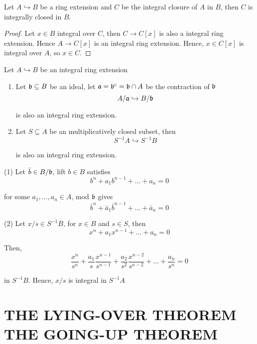 \begin{corollary}
	Let $A \hookrightarrow B$ be a ring extension and $C$ be the integral closure of $A$ in $B$, then $C$ is integrally closed in $B$.
\end{corollary}

\begin{proof}
	Let $x \in B$ integral over $C$, then $C \to C[x]$ is also a integral ring extension. Hence $A \to C[x]$ is an integral ring extension. Hence, $x \in C[x]$ is integral over $A$, so $x \in C$.
\end{proof}

\begin{proposition}
	Let $A \hookrightarrow B$ be an integral ring extension
	\begin{enumerate}
		\item Let $\mathfrak{b} \subseteq B$ be an ideal, let $\mathfrak{a} = \mathfrak{b}^c = \mathfrak{b} \cap A$ be the contraction of $\mathfrak{b}$
		$$
			A / \mathfrak{a} \hookrightarrow B / \mathfrak{b}
		$$
		
		is also an integral ring extension.
		
		\item Let $S \subseteq A$ be an multiplicatively closed subset, then 
		$$
			S^{-1} A \hookrightarrow S^{-1} B
		$$
		
		is also an integral ring extension.
	\end{enumerate}
\end{proposition}
\begin{longproof}
	(1) Let $\bar{b} \in B / \mathfrak{b}$, lift $b \in B$ satisfies
	$$
		b^n + a_1 b^{n-1} + ... + a_n = 0
	$$
	
	for some $a_1, ..., a_n \in A$, mod $\mathfrak{b}$ gives
	$$
		\bar{b}^n + \bar{a}_1 \bar{b}^{n-1} + ... + \bar{a}_n = 0
	$$
	
	(2) Let $x / s \in S^{-1} B$, for $x \in B$ and $s \in S$, then
	$$
		x^n + a_1 x^{n-1} + ... + a_n = 0
	$$
	
	Then,
	$$
		\frac{x^n}{s^n} + \frac{a_1}{s} \frac{x^{n-1}}{s^{n-1}} + \frac{a_2}{s^2} \frac{x^{n-2}}{s^{n-2}} + ... + \frac{a_n}{s^n} = 0
	$$
	
	in $S^{-1} B$. Hence, $x / s$ is integral in $S^{-1} A$
\end{longproof}

\section{THE LYING-OVER THEOREM \\ THE GOING-UP THEOREM}

